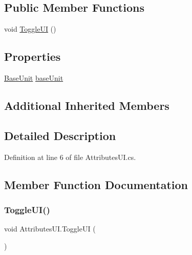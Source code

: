 \subsection*{Public Member Functions}
\begin{DoxyCompactItemize}
\item 
void \mbox{\hyperlink{class_attributes_u_i_a7cb7b0cebe1130576d6bbd279cb62ac1}{Toggle\+UI}} ()
\end{DoxyCompactItemize}
\subsection*{Properties}
\begin{DoxyCompactItemize}
\item 
\mbox{\hyperlink{class_base_unit}{Base\+Unit}} \mbox{\hyperlink{class_attributes_u_i_a346e8b850f9b6c18b78fc7175d89bea7}{base\+Unit}}
\end{DoxyCompactItemize}
\subsection*{Additional Inherited Members}


\subsection{Detailed Description}


Definition at line 6 of file Attributes\+U\+I.\+cs.



\subsection{Member Function Documentation}
\mbox{\label{class_attributes_u_i_a7cb7b0cebe1130576d6bbd279cb62ac1}} 
\subsubsection{\texorpdfstring{ToggleUI()}{ToggleUI()}}
{\footnotesize\ttfamily void Attributes\+U\+I.\+Toggle\+UI (\begin{DoxyParamCaption}{ }\end{DoxyParamCaption})}



